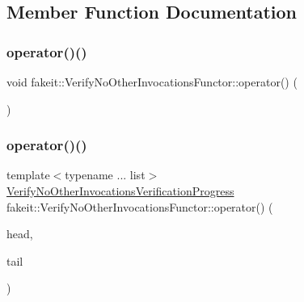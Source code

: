 \subsection{Member Function Documentation}
\mbox{\label{classfakeit_1_1VerifyNoOtherInvocationsFunctor_a40fae42fc436deb576fd08482382811a}} 
\subsubsection{\texorpdfstring{operator()()}{operator()()}\hspace{0.1cm}{\footnotesize\ttfamily [1/18]}}
{\footnotesize\ttfamily void fakeit\+::\+Verify\+No\+Other\+Invocations\+Functor\+::operator() (\begin{DoxyParamCaption}{ }\end{DoxyParamCaption})\hspace{0.3cm}{\ttfamily [inline]}}

\mbox{\label{classfakeit_1_1VerifyNoOtherInvocationsFunctor_a6f43e7d3b976534fa8f22abfad04004a}} 
\subsubsection{\texorpdfstring{operator()()}{operator()()}\hspace{0.1cm}{\footnotesize\ttfamily [2/18]}}
{\footnotesize\ttfamily template$<$typename ... list$>$ \\
\mbox{\hyperlink{classfakeit_1_1VerifyNoOtherInvocationsVerificationProgress}{Verify\+No\+Other\+Invocations\+Verification\+Progress}} fakeit\+::\+Verify\+No\+Other\+Invocations\+Functor\+::operator() (\begin{DoxyParamCaption}\item[{const \mbox{\hyperlink{structfakeit_1_1ActualInvocationsSource}{Actual\+Invocations\+Source}} \&}]{head,  }\item[{const list \&...}]{tail }\end{DoxyParamCaption})\hspace{0.3cm}{\ttfamily [inline]}}

